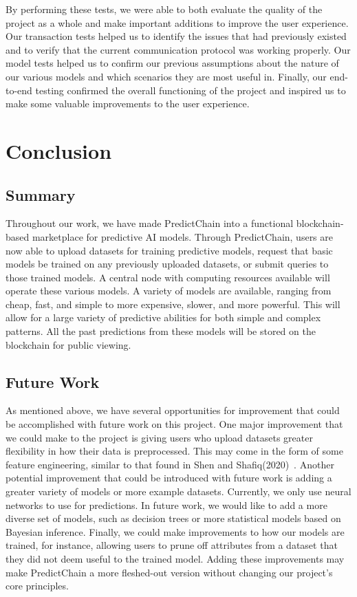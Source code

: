 \documentclass{ledger}
\begin{document}
By performing these tests, we were able to both evaluate the quality of the project as a whole and make important additions
to improve the user experience.  Our transaction tests helped us to identify the issues that had previously existed and
to verify that the current communication protocol was working properly.  Our model tests helped us to confirm our previous
assumptions about the nature of our various models and which scenarios they are most useful in.  Finally, our end-to-end
testing confirmed the overall functioning of the project and inspired us to make some valuable improvements to the user
experience.

\section{Conclusion}

\subsection{Summary}

Throughout our work, we have made PredictChain into a functional blockchain-based marketplace for predictive AI models.
Through PredictChain, users are now able to upload datasets for training predictive models, request that basic models be
trained on any previously uploaded datasets, or submit queries to those trained models. A central node with computing
resources available will operate these various models. A variety of
models are available, ranging from cheap, fast, and simple to more expensive, slower, and more powerful. This will allow
for a large variety of predictive abilities for both simple and complex patterns.  All the past predictions from these
models will be stored on the blockchain for public viewing.

\subsection{Future Work}

As mentioned above, we have several opportunities for improvement that could be accomplished with future work on this
project.  One major improvement that we could make to the project is giving users who upload datasets greater flexibility
in how their data is preprocessed.  This may come in the form of some feature engineering, similar to that found in Shen
and Shafiq(2020)~\cite{deepPrediction}.  Another potential improvement that could be introduced with future work is adding
a greater variety of models or more example datasets.  Currently, we only use neural networks to use for predictions.
In future work, we would like to add a more diverse set of models, such as decision trees or more statistical models based
on Bayesian inference.  Finally, we could make improvements to how our models are trained, for instance, allowing users
to prune off attributes from a dataset that they did not deem useful to the trained model.  Adding these improvements may
make PredictChain a more fleshed-out version without changing our project's core principles.
\end{document}
